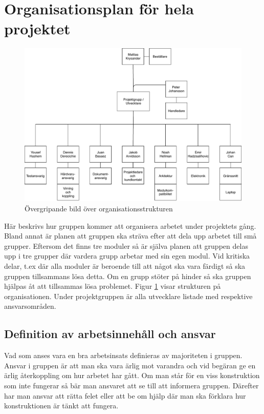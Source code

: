 \documentclass[projektplan/plan.tex]{subfiles}
\begin{document}
\section{Organisationsplan för hela projektet}

\begin{figure}[h]
    \centering
    \includegraphics[width=0.6\linewidth]{projektplan/figures/orgplan.pdf}
    \caption{Övergripande bild över organisationsstrukturen}
    \label{fig:orgplan}
\end{figure}
\noindent
Här beskrivs hur gruppen kommer att organisera arbetet under projektets gång.
Bland annat är planen att gruppen ska sträva efter att dela upp arbetet till
små grupper. Eftersom det finns tre moduler så är själva planen att gruppen
delas upp i tre grupper där vardera grupp arbetar med sin egen modul. Vid
kritiska delar, t.ex där alla moduler är beroende till att något ska vara
färdigt så ska gruppen tillsammans lösa detta. Om en grupp stöter på hinder så
ska gruppen hjälpas åt att tillsammas lösa problemet. Figur \ref{fig:orgplan}
visar strukturen på organisationen. Under projektgruppen är alla utvecklare
listade med respektive ansvarsområden.  

\subsection{Definition av arbetsinnehåll och ansvar}
Vad som anses vara en bra arbetsinsats definieras av majoriteten i gruppen.
Ansvar i gruppen är att man ska vara ärlig mot varandra och vid begäran ge en
ärlig återkoppling om hur arbetet har gått. Om man står för en viss
konstruktion som inte fungerar så bär man ansvaret att se till att informera
gruppen. Därefter har man ansvar att rätta felet eller att be om hjälp där man
ska förklara hur konstruktionen är tänkt att fungera.
\end{document}
